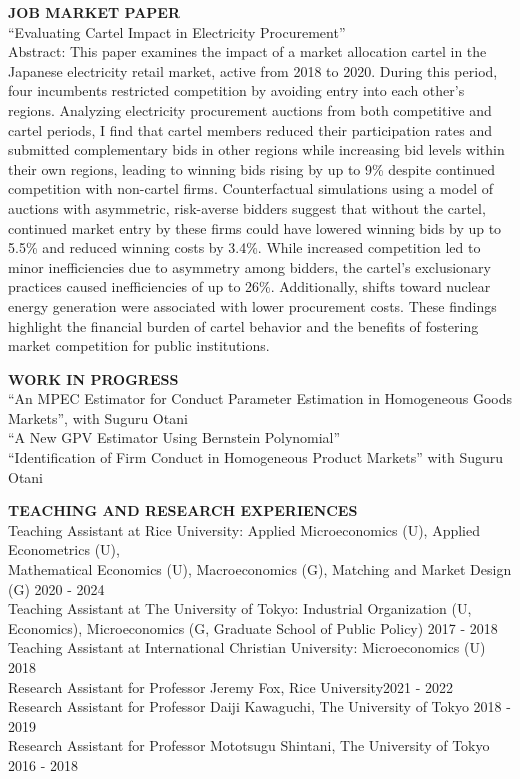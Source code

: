 \documentclass[10pt]{article}
\begin{document}
\textbf{JOB MARKET PAPER}\\
“Evaluating Cartel Impact in Electricity Procurement”\\
Abstract:  This paper examines the impact of a market allocation cartel in the Japanese electricity retail market, active from 2018 to 2020. During this period, four incumbents restricted competition by avoiding entry into each other's regions. Analyzing electricity procurement auctions from both competitive and cartel periods, I find that cartel members reduced their participation rates and submitted complementary bids in other regions while increasing bid levels within their own regions, leading to winning bids rising by up to 9\% despite continued competition with non-cartel firms. 
Counterfactual simulations using a model of auctions with asymmetric, risk-averse bidders suggest that without the cartel, continued market entry by these firms could have lowered winning bids by up to 5.5\% and reduced winning costs by 3.4\%. 
While increased competition led to minor inefficiencies due to asymmetry among bidders, the cartel's exclusionary practices caused inefficiencies of up to 26\%.
Additionally, shifts toward nuclear energy generation were associated with lower procurement costs. 
These findings highlight the financial burden of cartel behavior and the benefits of fostering market competition for public institutions.

\vspace{10pt}

\textbf{WORK IN PROGRESS} \\
“An MPEC Estimator for Conduct Parameter Estimation in Homogeneous Goods Markets”, with Suguru Otani\\
“A New GPV Estimator Using Bernstein Polynomial” \\
“Identification of Firm Conduct in Homogeneous Product Markets” with Suguru Otani

\vspace{10pt}

\textbf{TEACHING AND RESEARCH EXPERIENCES} \\
Teaching Assistant at Rice University: Applied Microeconomics (U), Applied Econometrics (U),\\
Mathematical Economics (U), Macroeconomics (G), Matching and Market Design (G) \hfill 2020 - 2024\\
Teaching Assistant at The University of Tokyo: Industrial Organization (U, Economics), Microeconomics (G, Graduate School of Public Policy) \hfill  2017 - 2018\\
Teaching Assistant at International Christian University: Microeconomics (U) \hfill 2018\\
Research Assistant for Professor Jeremy Fox, Rice University\hfill 2021 - 2022\\
Research Assistant for Professor Daiji Kawaguchi, The University of Tokyo \hfill 2018 - 2019\\
Research Assistant for Professor Mototsugu Shintani, The University of Tokyo \hfill 2016 - 2018
\end{document}
